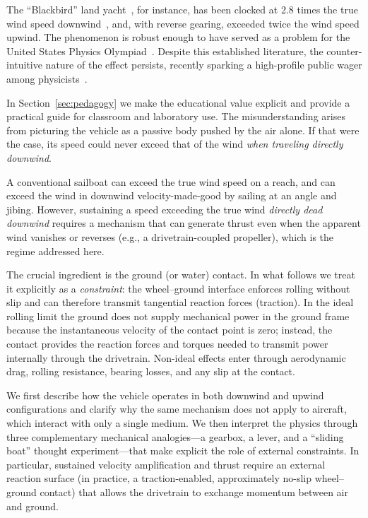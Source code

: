 \documentclass[reprint,aps,pra,longbibliography]{revtex4-2}
\begin{document}
The ``Blackbird'' land yacht~\cite{nahon-2023}, for instance, has been clocked at 2.8 times the true wind speed downwind~\cite{nalsa2010}, and, with reverse gearing, exceeded twice the wind speed upwind. The phenomenon is robust enough to have served as a problem for the United States Physics Olympiad~\cite{AAPT2013}. Despite this established literature, the counter-intuitive nature of the effect persists, recently sparking a high-profile public wager among physicists~\cite{veritasium2021}.

In Section~\ref{sec:pedagogy} we make the educational value explicit and provide a practical guide for classroom and laboratory use.
The misunderstanding arises from picturing the vehicle as a passive body pushed by the air alone. If that were the case, its speed could never exceed that of the wind \emph{when traveling directly downwind}.

A conventional sailboat can exceed the true wind speed on a reach, and can exceed the wind in downwind velocity-made-good by sailing at an angle and jibing. However, sustaining a speed exceeding the true wind \emph{directly dead downwind} requires a mechanism that can generate thrust even when the apparent wind vanishes or reverses (e.g., a drivetrain-coupled propeller), which is the regime addressed here.

The crucial ingredient is the ground (or water) contact. In what follows we treat it explicitly as a \emph{constraint}: the wheel--ground interface enforces rolling without slip and can therefore transmit tangential reaction forces (traction). In the ideal rolling limit the ground does not supply mechanical power in the ground frame because the instantaneous velocity of the contact point is zero; instead, the contact provides the reaction forces and torques needed to transmit power internally through the drivetrain. Non-ideal effects enter through aerodynamic drag, rolling resistance, bearing losses, and any slip at the contact.

We first describe how the vehicle operates in both downwind and upwind configurations and clarify why the same mechanism does not apply to aircraft, which interact with only a single medium. We then interpret the physics through three complementary mechanical analogies---a gearbox, a lever, and a ``sliding boat'' thought experiment---that make explicit the role of external constraints. In particular, sustained velocity amplification and thrust require an external reaction surface (in practice, a traction-enabled, approximately no-slip wheel--ground contact) that allows the drivetrain to exchange momentum between air and ground.
\end{document}

